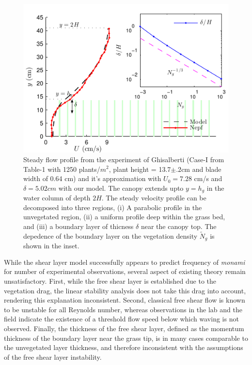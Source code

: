 \documentclass[aps,prl,reprint,twocolumn,showpacs,superscriptaddress,10pt]{revtex4-1}  %
\newcommand{\Ndg}{\tilde{N}_g}
\newcommand{\monami}{\textit{monami }}
\begin{document}
\begin{figure}
\includegraphics[scale=1]{Grass_Base_Nepf_shear}
\caption{Steady flow profile from the experiment of Ghisalberti\cite{Nepf04} (Case-I from Table-1 with 1250 plants/$m^2$, 
plant height = 13.7$\pm .2$cm and blade width of 0.64 cm)
 and it's approximation with $U_0=7.28$ cm/s and $\delta = 5.02cm$ with our model. The canopy extends upto $y=h_g$ in the water column of depth $2H$. 
The steady velocity profile can be decomposed into three regions, (i) A parabolic profile in the unvegetated region, (ii) a uniform profile deep within the grass bed, and (iii) a boundary layer of thicness $\delta$ near the canopy top. 
The depedence of the boundary layer on the vegetation density $\Ndg$ is shown in the inset.}
\label{basicflow}
\end{figure}

While the shear layer model successfully appears to predict frequency of \monami for number of experimental observations, several aspect of existing theory remain unsatisfactory. 
First, while the free shear layer is established due to the vegetation drag, the linear stability analysis\cite{Raupach96} does not take this drag into account, rendering this explanation inconsistent. 
Second, classical free shear flow is known to be unstable for all Reynolds number\cite{drazin}, whereas observations in the lab\cite{Ghisal02} and the field\cite{Grizzle96} indicate the existence of a threshold 
flow speed below which waving is not observed. 
Finally, the thickness of the free shear layer, defined as the momentum thickness of the boundary layer near the grass tip, is in many cases comparable to the unvegetated layer thickness,
and therefore inconsistent with the assumptions of the free shear layer instability. 
\end{document}
